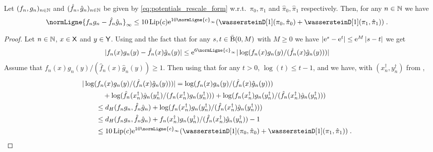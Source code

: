 \documentclass[11pt,a4paper]{article}
\begin{document}
\begin{theorem}
  \label{thm:contrat_infty}
  Let $(f_n, g_n)_{n \in \mathbb{N}}$ and $(\hat{f}_n, \hat g_n)_{n \in \mathbb{N}}$ be given by
  \eqref{eq:potentials_rescale_form} w.r.t.\  $\pi_0, \pi_1$ and
  $\hat{\pi}_0, \hat{\pi}_1$ respectively. Then, for any $n \in \mathbb{N}$ we have
  \begin{equation}
    \normLigne{f_ng_n -\hat{f}_n \hat{g}_n}_\infty \leq 10 \Lip(c) \rme^{10 \normLigne{c}_\infty} (\wassersteinD[1](\pi_0, \hat{\pi}_0) + \wassersteinD[1](\pi_1, \hat{\pi}_1) ) \eqsp . 
  \end{equation}
\end{theorem}

\begin{proof}
  Let $n \in \mathbb{N}$, $x \in \mathsf{X}$ and $y \in \mathsf{Y}$. Using 
  and the fact that for any $s,t \in \bar{\operatorname{B}}(0,M)$ with $M \geq 0$ we have
  $\left\vert \mathrm{e}^s - \mathrm{e}^t \right\vert \leq \mathrm{e}^M \left\vert s-t \right\vert$ we get 
  \begin{equation}
    \label{eq:bound_u}
  \absLigne{f_n(x)g_n(y) - \hat{f}_n(x) \hat{g}_n(y)} \leq \rme^{6 \normLigne{c}_\infty} \absLigne{\log(f_n(x)g_n(y)/(\hat{f}_n(x)\hat{g}_n(y)))}
\end{equation}
Assume that $f_n(x)g_n(y)/(\hat{f}_n(x)\hat{g}_n(y)) \geq 1$. Then using that
for any $t > 0$, $\log(t) \leq t - 1$,  and
 we have, with $(x_n^\dagger, y_n^\dagger)$ from ,
\begin{align}
  &\absLigne{\log(f_n(x)g_n(y)/(\hat{f}_n(x)\hat{g}_n(y)))} = \log(f_n(x)g_n(y)/(\hat{f}_n(x)\hat{g}_n(y))) \\
  & \qquad \quad + \log(\hat{f}_n(x_n^\dagger)\hat{g}_n(y_n^\dagger)/(f_n(x_n^\dagger)g_n(y_n^\dagger))) + \log(f_n(x_n^\dagger)g_n(y_n^\dagger)/(\hat{f}_n(x_n^\dagger)\hat{g}_n(y_n^\dagger))) \\
  &\qquad \leq d_H(f_n g_n, \hat{f}_n \hat{g}_n) + \log(f_n(x_n^\dagger)g_n(y_n^\dagger)/(\hat{f}_n(x_n^\dagger)\hat{g}_n(y_n^\dagger))) \\
  &\qquad \leq d_H(f_ng_n, \hat{f}_n \hat{g}_n) + f_n(x_n^\dagger)g_n(y_n^\dagger)/(\hat{f}_n(x_n^\dagger)\hat{g}_n(y_n^\dagger)) - 1 \\
  & \qquad \leq 10 \Lip(c)\rme^{10 \normLigne{c}_\infty} (\wassersteinD[1](\pi_0, \hat{\pi}_0) + \wassersteinD[1](\pi_1, \hat{\pi}_1) ) \eqsp . 
\end{align}


\end{proof}
\end{document}
